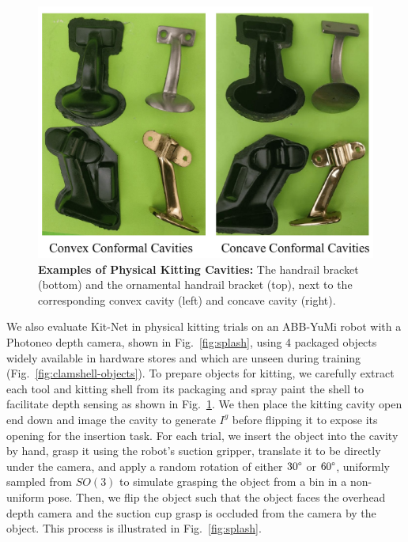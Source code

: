 \begin{figure}[t]
  \centering
  \includegraphics[width=\columnwidth]{figures/convex_concave_examples.pdf}
  \caption{\textbf{Examples of Physical Kitting Cavities: }The handrail bracket (bottom) and the ornamental handrail bracket (top), next to the corresponding convex cavity (left) and concave cavity (right).}
  \label{fig:clamshell-cavities}
\end{figure}

We also evaluate Kit-Net in physical kitting trials on an ABB-YuMi robot with a Photoneo depth camera, shown in Fig.~\ref{fig:splash}, using 4 packaged objects widely available in hardware stores and which are unseen during training (Fig.~\ref{fig:clamshell-objects}). %
To prepare objects for kitting, we carefully extract each tool and kitting shell from its packaging and spray paint the shell to facilitate depth sensing as shown in Fig.~\ref{fig:clamshell-cavities}. We then place the kitting cavity open end down and image the cavity to generate $I^g$ before flipping it to expose its opening for the insertion task. For each trial, we insert the object into the cavity by hand, grasp it using the robot's suction gripper, translate it to be directly under the camera, and apply a random rotation of either $30\degree$ or $60\degree$, uniformly sampled from $SO(3)$ to simulate grasping the object from a bin in a non-uniform pose. Then, we flip the object such that the object faces the overhead depth camera and the suction cup grasp is occluded from the camera by the object. This process is illustrated in Fig.~\ref{fig:splash}. 

